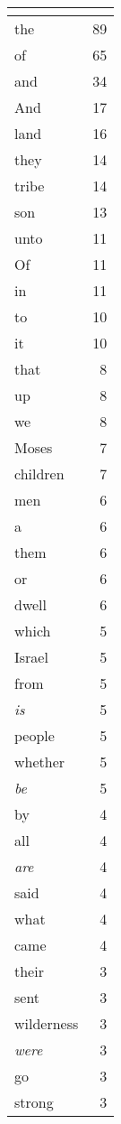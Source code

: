 \begin{center}
\begin{longtable}{l|r}
\hline \multicolumn{2}{c}{{ }} \\ \hline
\endfoot 
the & 89\\ \hline 
of & 65\\ \hline 
and & 34\\ \hline 
And & 17\\ \hline 
land & 16\\ \hline 
they & 14\\ \hline 
tribe & 14\\ \hline 
son & 13\\ \hline 
unto & 11\\ \hline 
Of & 11\\ \hline 
in & 11\\ \hline 
to & 10\\ \hline 
it & 10\\ \hline 
that & 8\\ \hline 
up & 8\\ \hline 
we & 8\\ \hline 
Moses & 7\\ \hline 
children & 7\\ \hline 
men & 6\\ \hline 
a & 6\\ \hline 
them & 6\\ \hline 
or & 6\\ \hline 
dwell & 6\\ \hline 
which & 5\\ \hline 
Israel & 5\\ \hline 
from & 5\\ \hline 
\emph{is} & 5\\ \hline 
people & 5\\ \hline 
whether & 5\\ \hline 
\emph{be} & 5\\ \hline 
by & 4\\ \hline 
all & 4\\ \hline 
\emph{are} & 4\\ \hline 
said & 4\\ \hline 
what & 4\\ \hline 
came & 4\\ \hline 
their & 3\\ \hline 
sent & 3\\ \hline 
wilderness & 3\\ \hline 
\emph{were} & 3\\ \hline 
go & 3\\ \hline 
strong & 3\\ \hline 

\end{longtable}
\end{center}
